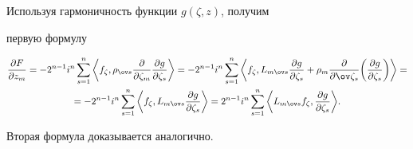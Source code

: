 \begin{pf} 


Используя гармоничность функции $g(\zeta,z)$, получим 


первую формулу 


\begin{multline*} 


\frac{\partial F}{\partial z_m}=-2^{n-1}i^n\sum^n_{s=1}\bigg\la 


f_\zeta,\rho_{\ov s}\frac{\partial }{\partial \zeta_m} 


\frac{\partial g}{\partial \zeta_s}\bigg\ra=-2^{n-1}i^n 


\sum^n_{s=1}\bigg\la f_\zeta,L_{m\ov s} 


\frac{\partial g}{\partial \zeta_s}+\rho_m 


\frac{\partial }{\partial \ov\zeta_s}\bigg( 


\frac{\partial g}{\partial \zeta_s}\bigg)\bigg\ra= \\ 


% 


=-2^{n-1}i^n\sum^n_{s=1}\bigg\la f_\zeta,L_{m\ov s} 


\frac{\partial g}{\partial \zeta_s}\bigg\ra=2^{n-1}i^n 


\sum^n_{s=1}\bigg\la L_{m\ov s}f_\zeta, 


\frac{\partial g}{\partial \zeta_s}\bigg\ra. 


\end{multline*} 


 


Вторая формула доказывается аналогично. 


\end{pf} 


 


